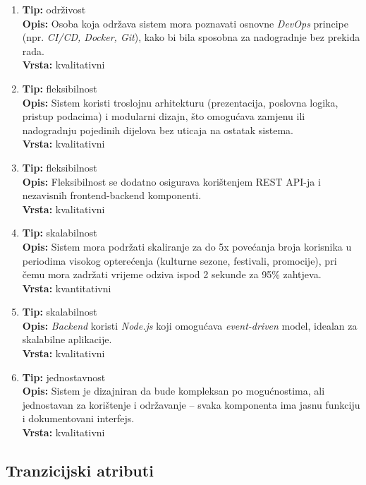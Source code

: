 \begin{enumerate}
    \item\textbf{Tip:} održivost\\
    \textbf{Opis:} Osoba koja održava sistem mora poznavati osnovne \textit{DevOps} principe (npr. \textit{CI/CD, Docker, Git}), kako bi bila sposobna za nadogradnje bez prekida rada.\\
    \textbf{Vrsta:} kvalitativni
    \item\textbf{Tip:} fleksibilnost\\
    \textbf{Opis:} Sistem koristi troslojnu arhitekturu (prezentacija, poslovna logika, pristup podacima) i modularni dizajn, što omogućava zamjenu ili nadogradnju pojedinih dijelova bez uticaja na ostatak sistema.\\
    \textbf{Vrsta:} kvalitativni
    \item\textbf{Tip:} fleksibilnost\\
    \textbf{Opis:} Fleksibilnost se dodatno osigurava korištenjem REST API-ja i nezavisnih frontend-backend komponenti.\\
    \textbf{Vrsta:} kvalitativni
    \item\textbf{Tip:} skalabilnost\\
    \textbf{Opis:} Sistem mora podržati skaliranje za do 5x povećanja broja korisnika u periodima visokog opterećenja (kulturne sezone, festivali, promocije), pri čemu mora zadržati vrijeme odziva ispod 2 sekunde za 95\% zahtjeva.\\
    \textbf{Vrsta:} kvantitativni
    \item\textbf{Tip:} skalabilnost\\
    \textbf{Opis:} \textit{Backend} koristi \textit{Node.js} koji omogućava \textit{event-driven }model, idealan za skalabilne aplikacije.\\
    \textbf{Vrsta:} kvalitativni
    \item\textbf{Tip:} jednostavnost\\
    \textbf{Opis:} Sistem je dizajniran da bude kompleksan po mogućnostima, ali jednostavan za korištenje i održavanje – svaka komponenta ima jasnu funkciju i dokumentovani interfejs.\\
    \textbf{Vrsta:} kvalitativni
\end{enumerate}

\sloppy
\subsection{Tranzicijski atributi}

